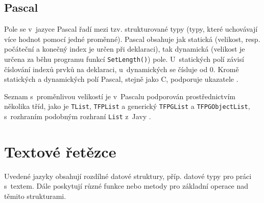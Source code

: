 \documentclass[czech,BP]{thesiskiv}
\begin{document}
\subsection{Pascal}
Pole se v~jazyce Pascal řadí mezi tzv. strukturované typy (typy, které uchovávají více hodnot pomocí jedné proměnné). Pascal obsahuje jak statická (velikost, resp. počáteční a konečný index je určen při deklaraci), tak dynamická (velikost je určena za běhu programu funkcí \texttt{SetLength()}) pole. U~statických polí závisí číslování indexů prvků na deklaraci, u~dynamických se čísluje od 0. Kromě statických a dynamických polí Pascal, stejně jako C, podporuje ukazatele \cite{pas-guide-structured-types, pas-guide-static-array, pas-guide-dynamic-array, pas-guide-pointer}.\par
Seznam s~proměnlivou velikostí je v~Pascalu podporován prostřednictvím několika tříd, jako je \texttt{TList}, \texttt{TFPList} a generický \texttt{TFPGList} a \texttt{TFPG\-ObjectList}, s~rozhraním podobným rozhraní \texttt{List} z~Javy \cite{pas-guide-tlist, pas-guide-tfplist, pas-guide-tfpglist, pas-guide-tfpgobjectlist}.

\section{Textové řetězce}\label{sec:strings}
Uvedené jazyky obsahují rozdílné datové struktury, příp. datové typy pro práci s~textem. Dále poskytují různé funkce nebo metody pro základní operace nad těmito strukturami.
\end{document}
